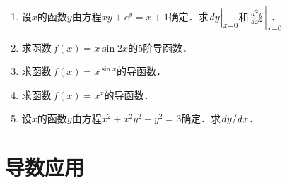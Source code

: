 \documentclass[a4paper,punct=CCT]{ctexbook}
\theoremstyle{definition}
\theoremstyle{remark}
\newif\ifshowsol
\begin{document}
\begin{enumerate}
\item 设\(x\)的函数\(y\)由方程\(xy + e^y = x + 1\)确定．求\(\dy\Big\vert_{x=0}\)和\(\ddn[y]x2\bigg\vert_{x=0}\mkern-22mu\)．
  \ifshowsol
  \begingroup
  \addtolength{\jot}{1ex}
  \begin{gather*}
    y \dx + x \dy + e^y \dy = \dx, \\
    \dydx = \frac{1-y}{x+e^y}, \\
    \dy\Big\vert_{x=0} = \dy\Big\vert_{\substack{x=0 \\ y =0}} = \dx, \\
    \ddn[y]x2 = \frac{-y'}{x+e^y} - \frac{(1-y)(1+e^yy')}{(x+e^y)^2}, \\
    \ddn[y]x2\Bigg\vert_{x=0}
    = \ddn[y]x2\Bigg\vert_{\substack{x=0 \\ y =0}}
    = -1 - 2 = -3.
  \end{gather*}
  \endgroup
  \fi

\item 求函数\(\,f(x) = x \sin 2x\)的\(5\)阶导函数．
  \ifshowsol
  \begin{equation*}
    f^{(5)}(x)
    = 5 \,\ddn x4 \sin 2x + x \,\ddn x5 \sin 2x
    = 16 (5\sin 2x + 2x \cos 2x).
  \end{equation*}
  \fi

\item 求函数\(\,f(x) = x^{\sin x}\)的导函数．
  \ifshowsol
  \begin{equation*}
    f'(x)
    = f(x) \,\ddx \ln\,f(x)
    = x^{\sin x} \,\ddx \sin x \ln x
    = x^{\sin x} \paren[\Big]{\cos x \ln x + \frac{\sin x}{x}}.
  \end{equation*}
  \fi

\item 求函数\(\,f(x) = x^x\)的导函数．
  \ifshowsol
  \begin{equation*}
    f'(x)
    = f(x) \,\ddx \ln\,f(x)
    = x^x \paren{\ln x + 1}.
  \end{equation*}
  \fi

\item 设\(x\)的函数\(y\)由方程\(x^2 + x^2y^2 + y^2 = 3\)确定．求\(\dy/\!\dx\)．
  \ifshowsol
  \begin{gather*}
    2x \dx + 2xy^2 \dx + 2x^2y \dy + 2y \dy = 0, \\
    \dydx = - \frac{2x+2xy^2}{2x^2y+2y} = - \frac{x(1+y^2)}{(x^2+1)y}.
  \end{gather*}
  \fi
\end{enumerate}
\fi

\chapter{导数应用}
\end{document}
